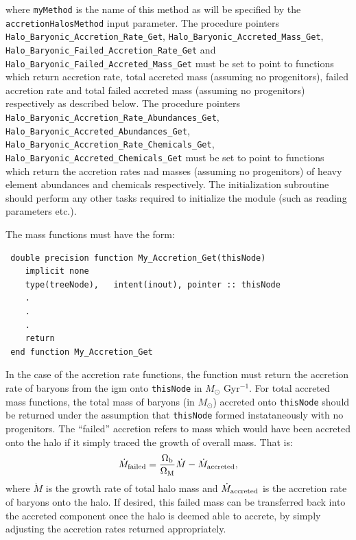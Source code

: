 where {\tt myMethod} is the name of this method as will be specified by the {\tt accretionHalosMethod} input parameter. The procedure pointers {\tt Halo\_Baryonic\_Accretion\_Rate\_Get}, {\tt Halo\_Baryonic\_Accreted\_Mass\_Get}, {\tt Halo\_Baryonic\_Failed\_Accretion\_Rate\_Get} and {\tt Halo\_Baryonic\_Failed\_Accreted\_Mass\_Get} must be set to point to functions which return accretion rate, total accreted mass (assuming no progenitors), failed accretion rate and total failed accreted mass (assuming no progenitors) respectively as described below. The procedure pointers {\tt Halo\_Baryonic\_Accretion\_Rate\_Abundances\_Get}, {\tt Halo\_Baryonic\_Accreted\_Abundances\_Get}, {\tt Halo\_Baryonic\_Accretion\_Rate\_Chemicals\_Get}, {\tt Halo\_Baryonic\_Accreted\_Chemicals\_Get} must be set to point to functions which return the accretion rates nad masses (assuming no progenitors) of heavy element abundances and chemicals respectively. The initialization subroutine should perform any other tasks required to 
initialize the module (such as reading parameters etc.).

The mass functions must have the form:
\begin{verbatim}
 double precision function My_Accretion_Get(thisNode)
    implicit none
    type(treeNode),   intent(inout), pointer :: thisNode
    .
    .
    .
    return
 end function My_Accretion_Get
\end{verbatim}
In the case of the accretion rate functions, the function must return the accretion rate of baryons from the \gls{igm} onto {\tt thisNode} in $M_\odot$ Gyr$^{-1}$. For total accreted mass functions, the total mass of baryons (in $M_\odot$) accreted onto {\tt thisNode} should be returned under the assumption that {\tt thisNode} formed instataneously with no progenitors. The ``failed'' accretion refers to mass which would have been accreted onto the halo if it simply traced the growth of overall mass. That is:
\begin{equation}
 \dot{M}_{\rm failed} = {\Omega_{\rm b} \over \Omega_{\rm M}} \dot{M} - \dot{M}_{\rm accreted},
\end{equation}
where $\dot{M}$ is the growth rate of total halo mass and $\dot{M}_{\rm accreted}$ is the accretion rate of baryons onto the halo. If desired, this failed mass can be transferred back into the accreted component once the halo is deemed able to accrete, by simply adjusting the accretion rates returned appropriately.

